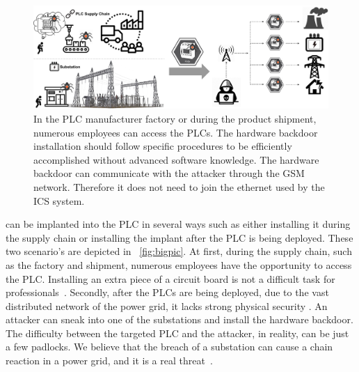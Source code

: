 \begin{figure}[tp!]
	\includegraphics[width=\textwidth]{figures/bigpic}
	\centering
	\caption{In the PLC manufacturer factory or during the product shipment, numerous employees can access the PLCs. The hardware backdoor installation should follow specific procedures to be efficiently accomplished without advanced software knowledge. The hardware backdoor can communicate with the attacker through the GSM network. Therefore it does not need to join the ethernet used by the ICS system.}
	\label{fig:bigpic}
\end{figure}

\name can be implanted into the PLC in several ways such as either installing it during the supply chain or installing the implant after the PLC is being deployed. These two scenario's are depicted in ~\autoref{fig:bigpic}. At first, during the supply chain, such as the factory and shipment, numerous employees have the opportunity to access the PLC. Installing an extra piece of a circuit board is not a difficult task for professionals~\cite{harrison2021malicious, o2015special}. Secondly, after the PLCs are being deployed, due to the vast distributed network of the power grid, it lacks strong physical security \cite{Loopholes2020}. An attacker can sneak into one of the substations and install the hardware backdoor. The difficulty between the targeted PLC and the attacker, in reality, can be just a few padlocks. We believe that the breach of a substation can cause a chain reaction in a power grid, and it is a real threat~\cite{substationattack, chen2020study}.




